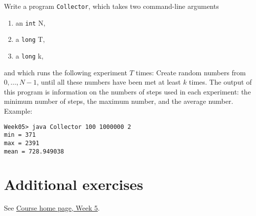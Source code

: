 \documentclass[11pt]{article}
\begin{document}
Write a program \texttt{Collector}, which takes two command-line arguments
\begin{enumerate}
\item an \texttt{int} N,
\item a \texttt{long} T,
\item a \texttt{long} k,
\end{enumerate}
and which runs the following experiment $T$ times: Create random numbers from $0, \dots, N-1$, until all these numbers have been met at least $k$ times. The output of this program is information on the numbers of steps used in each experiment: the minimum number of steps, the maximum number, and the average number. Example:
\begin{verbatim}
Week05> java Collector 100 1000000 2
min = 371
max = 2391
mean = 728.949038
\end{verbatim}


\section{Additional exercises}
\label{sec:addex}

See \href{\chp#ExercisesWeek05}{Course home page, Week 5}.
\end{document}
